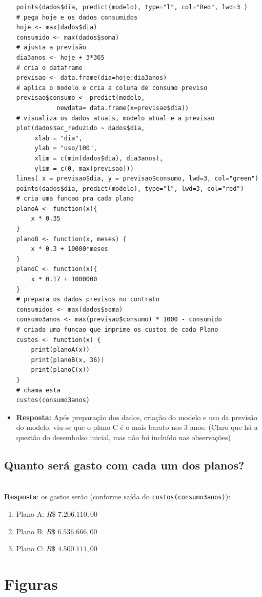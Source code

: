 \documentclass[a4paper,12pt]{article}
\begin{document}
\begin{itemize}
\begin{lstlisting}[language=Rlang]
points(dados$dia, predict(modelo), type="l", col="Red", lwd=3 ) 
# pega hoje e os dados consumidos
hoje <- max(dados$dia)
consumido <- max(dados$soma)
# ajusta a previsão
dia3anos <- hoje + 3*365
# cria o dataframe
previsao <- data.frame(dia=hoje:dia3anos)
# aplica o modelo e cria a coluna de consumo previso
previsao$consumo <- predict(modelo, 
           newdata= data.frame(x=previsao$dia))
# visualiza os dados atuais, modelo atual e a previsao
plot(dados$ac_reduzido ~ dados$dia, 
     xlab = "dia",
     ylab = "uso/100",
     xlim = c(min(dados$dia), dia3anos),
     ylim = c(0, max(previsao)))
lines( x = previsao$dia, y = previsao$consumo, lwd=3, col="green")
points(dados$dia, predict(modelo), type="l", lwd=3, col="red")
# cria uma funcao pra cada plano
planoA <- function(x){
    x * 0.35
}
planoB <- function(x, meses) {
    x * 0.3 + 10000*meses
}
planoC <- function(x){
    x * 0.17 + 1000000
}
# prepara os dados previsos no contrato
consumidos <- max(dados$soma)
consumo3anos <- max(previsao$consumo) * 1000 - consumido
# criada uma funcao que imprime os custos de cada Plano
custos <- function(x) {
    print(planoA(x))
    print(planoB(x, 36))
    print(planoC(x))
}
# chama esta
custos(consumo3anos)
\end{lstlisting}
    \item \textbf{Resposta:} Após preparação dos dados, criação do modelo e uso da previsão do modelo, viu-se que o
     plano C é o mais barato nos 3 anos. (Claro que há a questão do desembolso inicial, mas não foi incluído nas
     observações)
\end{itemize}


\subsection{Quanto será gasto com cada um dos planos?}\\

\textbf{Resposta}: os gastos serão (conforme saída do \texttt{custos(consumo3anos)}):

\begin{enumerate}
    \item Plano A: $R\$$   $7.206.110,00$
    \item Plano B: $R\$$   $6.536.666,00$
    \item Plano C: $R\$$   $4.500.111,00$
\end{enumerate}
  
\appendix{}

\section{Figuras}
\end{document}
